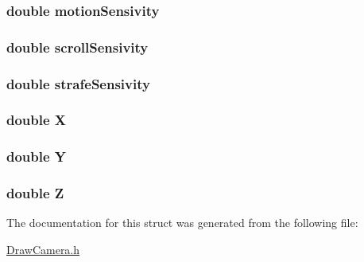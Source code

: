 \hypertarget{struct_cam_param__s_a7606bcd855caaae613b446c61ea6b678}{
\subsubsection[{motion\-Sensivity}]{\setlength{\rightskip}{0pt plus 5cm}double motion\-Sensivity}}\label{struct_cam_param__s_a7606bcd855caaae613b446c61ea6b678}
\hypertarget{struct_cam_param__s_aeef863ea6d36dc86ff3957e2239a2864}{
\subsubsection[{scroll\-Sensivity}]{\setlength{\rightskip}{0pt plus 5cm}double scroll\-Sensivity}}\label{struct_cam_param__s_aeef863ea6d36dc86ff3957e2239a2864}
\hypertarget{struct_cam_param__s_a4d6c1cafa99e592232e53c0b6ce86577}{
\subsubsection[{strafe\-Sensivity}]{\setlength{\rightskip}{0pt plus 5cm}double strafe\-Sensivity}}\label{struct_cam_param__s_a4d6c1cafa99e592232e53c0b6ce86577}
\hypertarget{struct_cam_param__s_a1059b82f84827fc49ea81b12566b3cdb}{
\subsubsection[{X}]{\setlength{\rightskip}{0pt plus 5cm}double X}}\label{struct_cam_param__s_a1059b82f84827fc49ea81b12566b3cdb}
\hypertarget{struct_cam_param__s_ac8d59bf77d5ef21e7c7a88b08f14c825}{
\subsubsection[{Y}]{\setlength{\rightskip}{0pt plus 5cm}double Y}}\label{struct_cam_param__s_ac8d59bf77d5ef21e7c7a88b08f14c825}
\hypertarget{struct_cam_param__s_a0f16a8f561453187897f0820186da39b}{
\subsubsection[{Z}]{\setlength{\rightskip}{0pt plus 5cm}double Z}}\label{struct_cam_param__s_a0f16a8f561453187897f0820186da39b}


The documentation for this struct was generated from the following file\-:\begin{DoxyCompactItemize}
\item 
\hyperlink{_draw_camera_8h}{Draw\-Camera.\-h}\end{DoxyCompactItemize}
